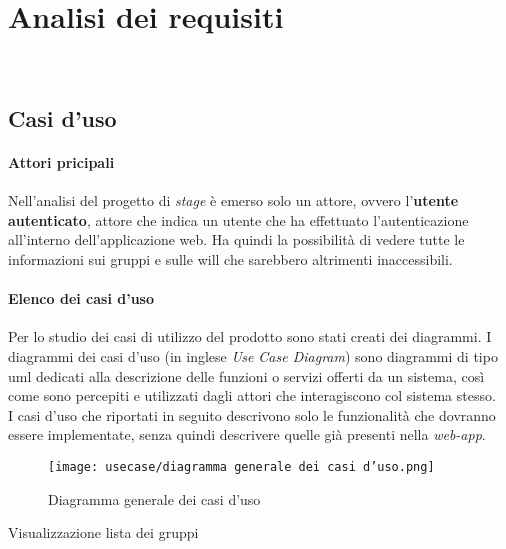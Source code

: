 
\chapter{Analisi dei requisiti}
\label{cap:analisi-requisiti}

\\

\section{Casi d'uso}
\subsubsection{Attori pricipali}
Nell'analisi del progetto di \textit{stage} è emerso solo un attore, ovvero l'\textbf{utente autenticato}, 
attore che indica un utente che ha effettuato l'autenticazione
all'interno dell'applicazione web. Ha quindi la possibilità di vedere tutte le
informazioni sui gruppi e sulle \gls{will}  che sarebbero altrimenti inaccessibili. 

\subsubsection{Elenco dei casi d'uso}
Per lo studio dei casi di utilizzo del prodotto sono stati creati dei diagrammi.
I diagrammi dei casi d'uso (in inglese \emph{Use Case Diagram}) sono diagrammi di tipo \gls{uml} dedicati alla descrizione delle funzioni o servizi offerti da un sistema, così come sono percepiti e utilizzati dagli attori che interagiscono col sistema stesso.\\
I casi d'uso che riportati in seguito descrivono solo le funzionalità che dovranno essere implementate, senza quindi descrivere quelle già presenti nella \textit{web-app}. 
\begin{figure}[H] 
    \centering 
    \texttt{[image: usecase/diagramma generale dei casi d'uso.png]} 
    \caption{Diagramma generale dei casi d'uso}
\end{figure}

\begin{usecase}{Visualizzazione lista dei gruppi}
    \label{uc:scenario-visualizzazione-lista-gruppi}
\end{usecase}

